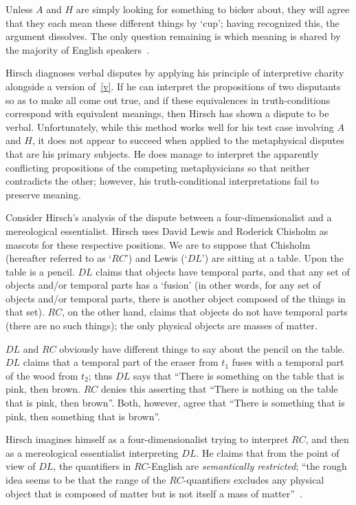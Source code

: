 \documentclass[11pt]{article}
\begin{document}
\begin{spacing}{1.25}
Unless $A$ and $H$ are simply looking for something to bicker about,
they will agree that they each mean these different things by `cup';
having recognized this, the argument dissolves.  The only question
remaining is which meaning is shared by the majority of English
speakers~\citep[70]{hirsch2005}.

Hirsch diagnoses verbal disputes by applying his principle of
interpretive charity alongside a version of~\ref{v}.  If he can
interpret the propositions of two disputants so as to make all come
out true, and if these equivalences in truth-conditions correspond
with equivalent meanings, then Hirsch has shown a dispute to be
verbal.  Unfortunately, while this method works well for his test case
involving $A$ and $H$, it does not appear to succeed when applied to
the metaphysical disputes that are his primary subjects.  He does
manage to interpret the apparently conflicting propositions of the
competing metaphysicians so that neither contradicts the other;
however, his truth-conditional interpretations fail to preserve
meaning.

Consider Hirsch's analysis of the dispute between a
four-dimensionalist and a mereological essentialist.  Hirsch uses
David Lewis and Roderick Chisholm as mascots for these respective
positions.  We are to suppose that Chisholm (hereafter referred to as
`$RC$') and Lewis (`$DL$') are sitting at a table.  Upon the table is
a pencil. $DL$ claims that objects have temporal parts, and that any
set of objects and/or temporal parts has a `fusion' (in other words,
for any set of objects and/or temporal parts, there is another object
composed of the things in that set).  $RC$, on the other hand, claims
that objects do not have temporal parts (there are no such things);
the only physical objects are masses of matter.

$DL$ and $RC$ obviously have different things to say about the pencil
on the table.  $DL$ claims that a temporal part of the eraser from
$t_{1}$ fuses with a temporal part of the wood from $t_{2}$; thus $DL$
says that ``There is something on the table that is pink, then brown.
$RC$ denies this asserting that ``There is nothing on the table that
is pink, then brown''.  Both, however, agree that ``There is something
that is pink, then something that is brown''.

Hirsch imagines himself as a four-dimensionalist trying to interpret
$RC$, and then as a mereological essentialist interpreting $DL$.  He
claims that from the point of view of $DL$, the quantifiers in
$RC$-English are {\em semantically restricted}; ``the rough idea seems
to be that the range of the $RC$-quantifiers excludes any physical
object that is composed of matter but is not itself a mass of
matter''~\citep[76]{hirsch2005}.


\end{spacing}
\end{document}
